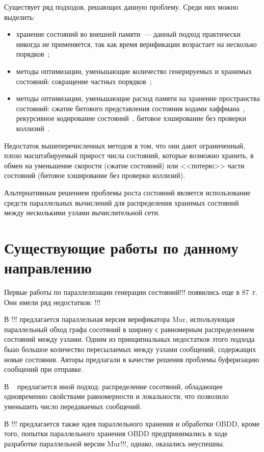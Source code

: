 \documentclass[a4paper,notitlepage,14pt]{article}
\begin{document}
Существует ряд подходов, решающих данную проблему. Среди них можно выделить:

\begin{itemize}
\item хранение состояний во внешней памяти~--- данный подход практически никогда не
  применяется, так как время верификации возрастает на несколько порядков~\cite{Clarke};
\item методы оптимизации, уменьшающие количество генерируемых и хранимых состояний:
  сокращение частных порядков~\cite{POD};
\item методы оптимизации, уменьшающие расход памяти на хранение пространства состояний:
  сжатие битового представления состояния кодами хаффмана~\cite{StateCompr}, рекурсивное
  кодирование состояний~\cite{StateCompr}, битовое хэширование без проверки
  коллизий~\cite{BitHash1,Wolper}.
\end{itemize}

Недостаток вышеперечисленных методов в том, что они дают ограниченный, плохо
масштабируемый прирост числа состояний, которые возможно хранить, в обмен на уменьшение
скорости (сжатие состояний) или <<потерю>> части состояний (битовое хэширование без
проверки коллизий).

Альтернативным решением проблемы роста состояний является использование средств
параллельных вычислений для распределения хранимых состояний между несколькими узлами
вычислительной сети.

\section{Существующие работы по данному направлению}
\label{sec:other-work}

Первые работы по параллелизации генерации состояний!!! появились еще в 87~г. Они
имели ряд недостатков: !!!

В !!! предлагается параллельная версия верификатора Mur\phi, использующая параллельный
обход графа сосотяний в ширину с равномерным распределением состояний между узлами. Одним
из принципиальных недостатков этого подхода быао большое количество пересылаемых между
узлами сообщений, содержащих новые состояния. Авторы предлагали в качестве решения
проблемы буферизацию сообщений при отправке.

В ~\cite{LS99} предлагается иной подход: распределение сосотяний, обладающее одновременно
свойствами равномерности и локальности, что позволило уменьшить число передаваемых
сообщений.

В !!! предлагается также идея параллельного хранения и обработки OBDD, кроме того, попытки
параллельного хранения OBDD предпринимались в ходе разработке параллельной версии
Mur\phi!!!, однако, оказались неуспешны.
\end{document}
